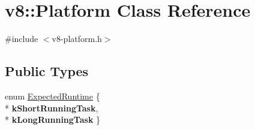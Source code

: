 \hypertarget{classv8_1_1_platform}{}\section{v8\+:\+:Platform Class Reference}
\label{classv8_1_1_platform}


{\ttfamily \#include $<$v8-\/platform.\+h$>$}

\subsection*{Public Types}
\begin{DoxyCompactItemize}
\item 
enum \hyperlink{classv8_1_1_platform_ace7f666b2b5995bb0e898e12fa660718}{Expected\+Runtime} \{ \\*
{\bfseries k\+Short\+Running\+Task}, 
\\*
{\bfseries k\+Long\+Running\+Task}
 \}
\end{DoxyCompactItemize}
